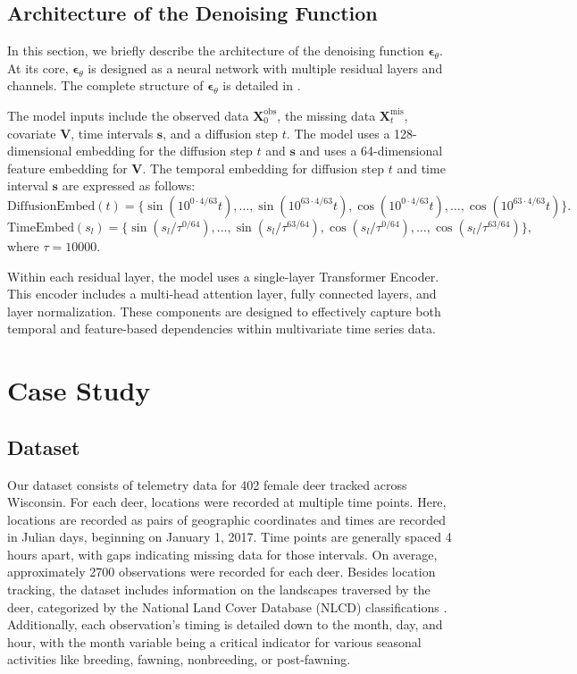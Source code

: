 \documentclass[11pt]{article}
\begin{document}
\subsection{Architecture of the Denoising Function}
In this section, we briefly describe the architecture of the denoising function $\bm{\epsilon}_{\theta}$. At its core, $\bm{\epsilon}_{\theta}$ is designed as a neural network with multiple residual layers and channels. The complete structure of $\bm{\epsilon}_{\theta}$ is detailed in \citet{tashiro2021csdi}.

The model inputs include the observed data $\bm{X}_0^{\mathrm{obs}}$, the missing data $\bm{X}_t^{\mathrm{mis}}$, covariate $\bm{V}$, time intervals $\bm{s}$, and a diffusion step $t$. The model uses a 128-dimensional embedding for 
the diffusion step $t$ and $\bm{s}$ \citep{vaswani2017attention} and uses a 64-dimensional feature embedding for $\bm{V}$. The temporal embedding for diffusion step $t$ and time interval $\bm{s}$ are expressed as follows:
\begin{equation}
	\mathrm{DiffusionEmbed}(t)=\{\sin(10^{0\cdot 4/63}t),\ldots, \sin(10^{63\cdot 4/63}t), \cos(10^{0\cdot 4/63}t),\ldots,\cos(10^{63\cdot 4/63}t)\}.
\end{equation}
\begin{equation}
	\mathrm{TimeEmbed}(s_l)=\{\sin(s_l/\tau^{0/64}),\ldots, \sin(s_l/\tau^{63/64}), \cos(s_l/\tau^{0/64}),\ldots,\cos(s_l/\tau^{63/64})\},
\end{equation}
where $\tau=10000$. 


Within each residual layer, the model uses a single-layer Transformer Encoder. This encoder includes a multi-head attention layer, fully connected layers, and layer normalization. These components are designed to effectively capture both temporal and feature-based dependencies within multivariate time series data. 







\section{Case Study}
\subsection{Dataset}
Our dataset consists of telemetry data for 402 female deer tracked across Wisconsin. For each deer, locations were recorded at multiple time points. Here, locations are recorded as pairs of geographic coordinates and times are recorded in Julian days, beginning on January 1, 2017. Time points are generally spaced 4 hours apart, with gaps indicating missing data for those intervals. On average, approximately 2700 observations were recorded for each deer. Besides location tracking, the dataset includes information on the landscapes traversed by the deer, categorized by the National Land Cover Database (NLCD) classifications \citep{anderson1976land}. Additionally, each observation's timing is detailed down to the month, day, and hour, with the month variable being a critical indicator for various seasonal activities like breeding, fawning, nonbreeding, or post-fawning.
\end{document}
